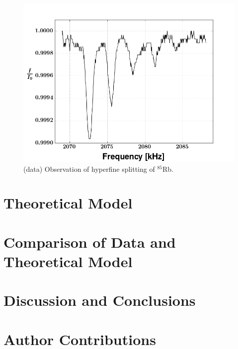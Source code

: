 \documentclass[aps,prl,twocolumn,groupedaddress]{revtex4-1}
\begin{document}
\begin{figure}
\includegraphics[width=\columnwidth]{rb85-hyperfine_split.png}
\caption{\label{HyperFineSplit} (data) Observation of hyperfine splitting of $^{85}$Rb.}
\end{figure}

\section{Theoretical Model}
\section{Comparison of Data and Theoretical Model}
\section{Discussion and Conclusions}
\section{Author Contributions}


\end{document}
